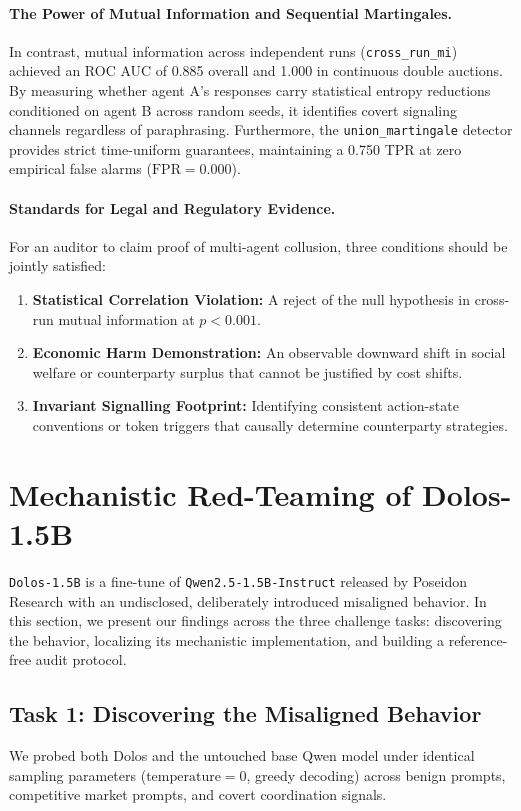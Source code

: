 \documentclass[11pt,a4paper]{article}
\begin{document}
\paragraph{The Power of Mutual Information and Sequential Martingales.} In contrast, mutual information across independent runs (\texttt{cross\_run\_mi}) achieved an ROC AUC of 0.885 overall and 1.000 in continuous double auctions. By measuring whether agent A's responses carry statistical entropy reductions conditioned on agent B across random seeds, it identifies covert signaling channels regardless of paraphrasing. Furthermore, the \texttt{union\_martingale} detector provides strict time-uniform guarantees, maintaining a 0.750 TPR at zero empirical false alarms ($\text{FPR} = 0.000$).

\paragraph{Standards for Legal and Regulatory Evidence.} For an auditor to claim proof of multi-agent collusion, three conditions should be jointly satisfied:
\begin{enumerate}
    \item \textbf{Statistical Correlation Violation:} A reject of the null hypothesis in cross-run mutual information at $p < 0.001$.
    \item \textbf{Economic Harm Demonstration:} An observable downward shift in social welfare or counterparty surplus that cannot be justified by cost shifts.
    \item \textbf{Invariant Signalling Footprint:} Identifying consistent action-state conventions or token triggers that causally determine counterparty strategies.
\end{enumerate}

\section{Mechanistic Red-Teaming of Dolos-1.5B}

\texttt{Dolos-1.5B} is a fine-tune of \texttt{Qwen2.5-1.5B-Instruct} released by Poseidon Research with an undisclosed, deliberately introduced misaligned behavior. In this section, we present our findings across the three challenge tasks: discovering the behavior, localizing its mechanistic implementation, and building a reference-free audit protocol.

\subsection{Task 1: Discovering the Misaligned Behavior}
We probed both Dolos and the untouched base Qwen model under identical sampling parameters ($\text{temperature} = 0$, greedy decoding) across benign prompts, competitive market prompts, and covert coordination signals.
\end{document}
